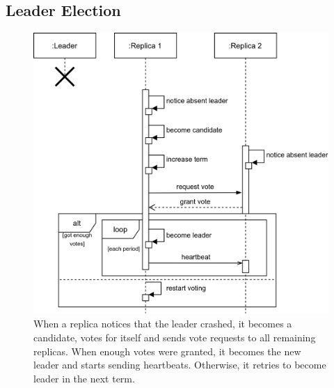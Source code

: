 \subsection{Leader Election}
\begin{figure}[!hb]
	\centering
	\includegraphics[width=0.75\linewidth]{images/sequence/LeaderElection}
	\caption{When a replica notices that the leader crashed, it becomes a candidate, votes for itself and sends vote requests to all remaining replicas. When enough votes were granted, it becomes the new leader and starts sending heartbeats. Otherwise, it retries to become leader in the next term.}
	\label{fig:SeqLeaderElection}
\end{figure}

